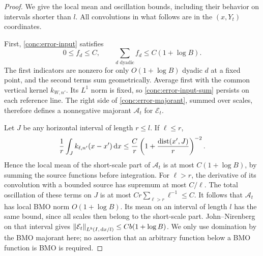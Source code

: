 \begin{proof}
We give the local mean and oscillation bounds, including their behavior
on intervals shorter than $l$.  All convolutions in what follows are
in the $(x,Y_t)$ coordinates.

First, \eqref{conc:error-input} satisfies
\begin{equation}\label{conc:error-input-sum}
 0\leq f_d\leq C,\qquad \sum_{d\text{ dyadic}}f_d\leq C(1+\log B).
\end{equation}
The first indicators are nonzero for only $O(1+\log B)$ dyadic $d$ at
a fixed point, and the second terms sum geometrically.  Average first
with the common vertical kernel $k_{W,n'}$.  Its $L^1$ norm is fixed,
so \eqref{conc:error-input-sum} persists on each reference line.
The right side of \eqref{conc:error-majorant}, summed over scales,
therefore defines a nonnegative majorant $\mathcal A_t$ for
$\mathcal E_t$.

Let $J$ be any horizontal interval of length $r\leq l$.  If $\ell\leq r$,
\[
 \frac1r\int_J k_{\ell,n'}(x-x')\,\mathrm d x
 \leq \frac Cr\left(1+\frac{\operatorname{dist}(x',J)}r\right)^{-2}.
\]
Hence the local mean of the short-scale part of $\mathcal A_t$ is at
most $C(1+\log B)$, by summing the source functions before integration.
For $\ell>r$, the derivative of its convolution with a bounded source
has supremum at most $C/\ell$.  The total oscillation of these terms
on $J$ is at most $Cr\sum_{\ell>r}\ell^{-1}\leq C$.
It follows that $\mathcal A_t$ has local BMO norm
$O(1+\log B)$.  Its mean on an interval of length $l$ has the same
bound, since all scales then belong to the short-scale part.
John--Nirenberg on that interval gives
$\left\|\mathcal E_t\right\|_{L^b(I,\,\mathrm d x/l)}\leq Cb(1+\log B)$.
We only use domination by the BMO majorant here; no assertion that an
arbitrary function below a BMO function is BMO is required.


\end{proof}
